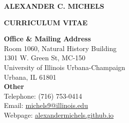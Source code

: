 \documentclass{acmcv}
\begin{document}
\begin{center}
    \fontsize{14}{16}\textbf{ALEXANDER C. MICHELS}\\
    \vspace*{.8cm}

    \fontsize{12}{14}\textbf{CURRICULUM VITAE}
    \vspace*{.25cm}
\end{center}


\begin{multicols}{2}
    \textbf{Office \& Mailing Address}\\
    Room 1060, Natural History Building\\
    1301 W. Green St, MC-150\\
    University of Illinois Urbana-Champaign\\
    Urbana, IL 61801\\
    
    \textbf{Other}\\
    Telephone: (716) 753-0414\\
    Email: \href{mailto:michels9@illinois.edu}{michels9@illinois.edu}\\
    Webpage: \href{http://alexandermichels.github.io}{alexandermichels.github.io}
    
\end{multicols}


	
\end{document}
